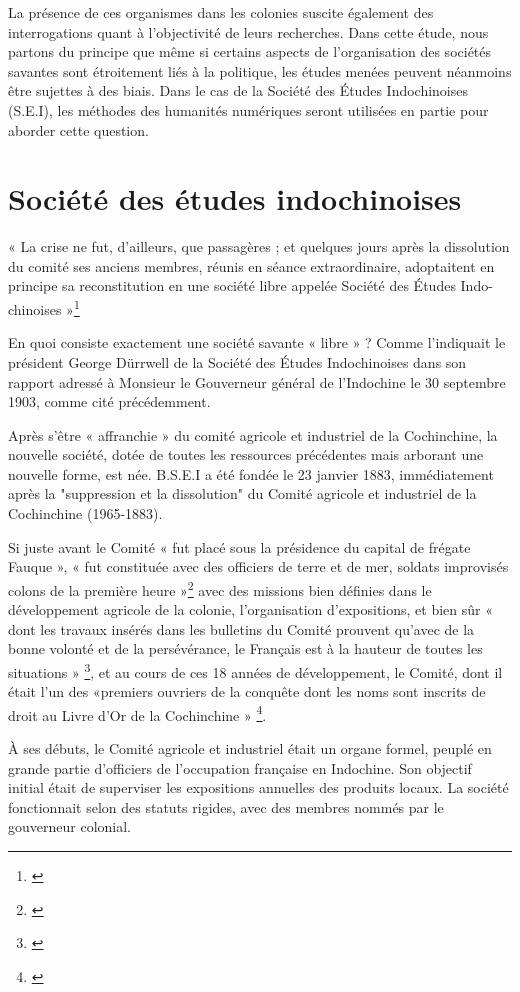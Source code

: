 La présence de ces organismes dans les colonies suscite également des interrogations quant à l'objectivité de leurs recherches. Dans cette étude, nous partons du principe que même si certains aspects de l'organisation des sociétés savantes sont étroitement liés à la politique, les études menées peuvent néanmoins être sujettes à des biais. Dans le cas de la Société des Études Indochinoises (S.E.I), les méthodes des humanités numériques seront utilisées en partie pour aborder cette question. 


\section{Société des études indochinoises}
« La crise ne fut, d’ailleurs, que passagères ; et quelques jours après la dissolution du comité ses anciens membres, réunis en séance extraordinaire, adoptaitent en principe sa reconstitution en une société libre appelée Société des Études Indo-chinoises »\footnote{\cite{soci}}

En quoi consiste exactement une société savante « libre » ? Comme l'indiquait le président George Dürrwell de la Société des Études Indochinoises dans son rapport adressé à Monsieur le Gouverneur général de l'Indochine le 30 septembre 1903, comme cité précédemment.

Après s'être « affranchie » du comité agricole et industriel de la Cochinchine, la nouvelle société, dotée de toutes les ressources précédentes mais arborant une nouvelle forme, est née. B.S.E.I a été fondée le 23 janvier 1883, immédiatement après la "suppression et la dissolution" du Comité agricole et industriel de la Cochinchine (1965-1883).

Si juste avant le Comité « fut placé sous la présidence du capital de frégate Fauque », « fut constituée avec des officiers de terre et de mer, soldats improvisés colons de la première heure »\footnote{\cite{a}} avec des missions bien définies dans le développement agricole de la colonie, l'organisation d'expositions, et bien sûr « dont les travaux insérés dans les bulletins du Comité prouvent qu’avec de la bonne volonté et de la persévérance, le Français est à la hauteur de toutes les situations » \footnote{\cite{a}}, et au cours de ces 18 années de développement, le Comité, dont il était l'un des «premiers ouvriers de la conquête dont les noms sont inscrits de droit au Livre d’Or de la Cochinchine » \footnote{\cite{soci}}. 

À ses débuts, le Comité agricole et industriel était un organe formel, peuplé en grande partie d'officiers de l'occupation française en Indochine. Son objectif initial était de superviser les expositions annuelles des produits locaux. La société fonctionnait selon des statuts rigides, avec des membres nommés par le gouverneur colonial.

